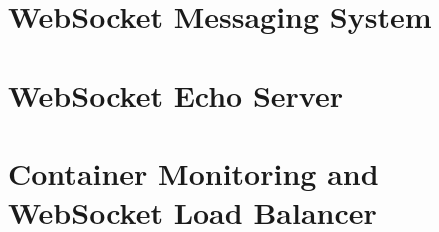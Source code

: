 \chapter{WebSocket Messaging System}
\label{chapter:appendix-websocketMessagingSystem}










\chapter{WebSocket Echo Server}
\label{chapter:appendix-websocketEchoServer}











\chapter{Container Monitoring and WebSocket Load Balancer}
\label{chapter:appendix-dockerLoadBalancingAndMonitoring}






